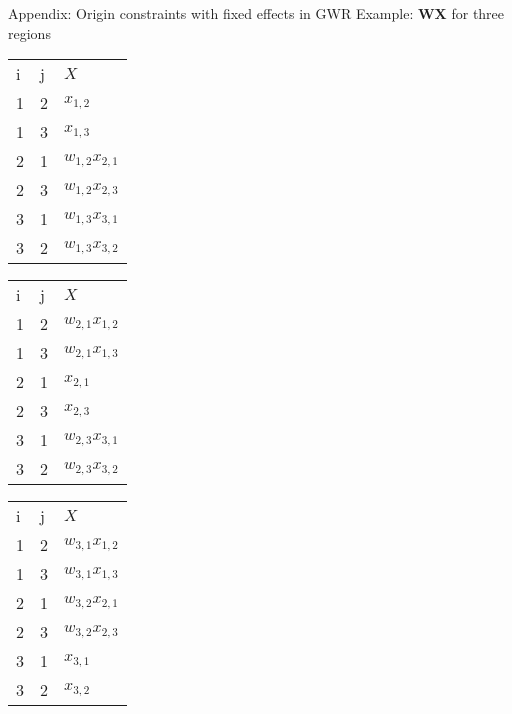 \documentclass[final, 12pt, aspectratio=169, xcolor={dvipsnames}]{beamer}
\begin{document}
\begin{frame}{Appendix: Origin constraints with fixed effects in GWR}
  Example: $\mathbf{WX}$ for three regions
  \begin{table}
    \begin{tabular}{lll}
      i & j &  $X$  \\
      1 & 2 &  $x_{1,2}$  \\
      1 & 3 &  $x_{1,3}$  \\
      2 & 1 &  $w_{1,2}x_{2,1}$  \\
      2 & 3 &  $w_{1,2}x_{2,3}$  \\
      3 & 1 &  $w_{1,3}x_{3,1}$  \\
      3 & 2 &  $w_{1,3}x_{3,2}$  \\
    \end{tabular}
    \qquad
    \begin{tabular}{lll}
      i & j &  $X$  \\
      1 & 2 &  $w_{2,1}x_{1,2}$  \\
      1 & 3 &  $w_{2,1}x_{1,3}$  \\
      2 & 1 &  $x_{2,1}$  \\
      2 & 3 &  $x_{2,3}$  \\
      3 & 1 &  $w_{2,3}x_{3,1}$  \\
      3 & 2 &  $w_{2,3}x_{3,2}$  \\
    \end{tabular}
    \qquad
    \begin{tabular}{lll}
      i & j &  $X$  \\
      1 & 2 &  $w_{3,1}x_{1,2}$  \\
      1 & 3 &  $w_{3,1}x_{1,3}$  \\
      2 & 1 &  $w_{3,2}x_{2,1}$  \\
      2 & 3 &  $w_{3,2}x_{2,3}$  \\
      3 & 1 &  $x_{3,1}$  \\
      3 & 2 &  $x_{3,2}$  \\
      \end{tabular}
    \end{table}
\end{frame}
\end{document}
